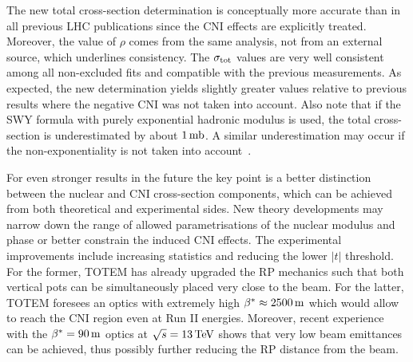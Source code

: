 The new total cross-section determination is conceptually more accurate than in all previous LHC publications since the CNI effects are explicitly treated. Moreover, the value of $\rho$ comes from the same analysis, not from an external source, which underlines consistency. The $\sigma_{\rm tot}$ values are very well consistent among all non-excluded fits and compatible with the previous measurements. As expected, the new determination yields slightly greater values relative to previous results where the negative CNI was not taken into account. Also note that if the SWY formula with purely exponential hadronic modulus is used, the total cross-section is underestimated by about $1\,{\rm mb}$. A similar underestimation may occur if the non-exponentiality is not taken into account~\cite{block16}.

For even stronger results in the future the key point is a better distinction between the nuclear and CNI cross-section components, which can be achieved from both theoretical and experimental sides. New theory developments may narrow down the range of allowed parametrisations of the nuclear modulus and phase or better constrain the induced CNI effects. The experimental improvements include increasing statistics and reducing the lower $|t|$ threshold. For the former, TOTEM has already upgraded the RP mechanics such that both vertical pots can be simultaneously placed very close to the beam. For the latter, TOTEM foresees an optics with extremely high $\beta^* \approx 2500\,{\rm m}$ which would allow to reach the CNI region even at Run II energies. Moreover, recent experience with the $\beta^* = 90\,{\rm m}$ optics at $\sqrt s = 13\,{\rm TeV}$ shows that very low beam emittances can be achieved, thus possibly further reducing the RP distance from the beam.
\fi
